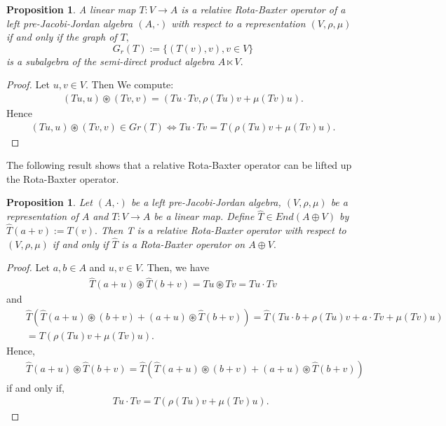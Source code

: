 \documentclass[12pt]{amsart}
\newtheorem{proposition}[Theorem]{Proposition}
\begin{document}
\begin{proposition}
	A linear map $T : V\rightarrow A$ is a relative Rota-Baxter operator of a left pre-Jacobi-Jordan  algebra $(A, \cdot)$ with respect to a representation $(V,\rho,\mu)$  if and only if the graph of $T,$
	$$G_r(T):=\{(T(v), v), v\in  V\}$$
	is a subalgebra of the semi-direct product algebra $A\ltimes V.$
\end{proposition}
\begin{proof}
	Let $u,v\in V.$ Then  We compute:
	\begin{eqnarray}
		(Tu,u)\circledast (Tv,v)=(Tu\cdot Tv, \rho(Tu)v+\mu(Tv)u).\nonumber
	\end{eqnarray}
	Hence 
	\begin{eqnarray}
		(Tu,u)\circledast (Tv,v)\in Gr(T)\Leftrightarrow Tu\cdot Tv=T(\rho(Tu)v+\mu(Tv)u).\nonumber
	\end{eqnarray}
\end{proof}
The following result shows that a relative Rota-Baxter operator can be lifted up the
Rota-Baxter operator.
\begin{proposition}
	Let $(A, \cdot)$ be a left pre-Jacobi-Jordan algebra, $(V,\rho,\mu)$ be a representation of $A$ and
	$T : V\rightarrow A$ be a linear map. Define 
	$\widehat{T}\in End(A\oplus V)$ by 
	$\widehat{T}(a+v):=T(v).$ Then T is a relative Rota-Baxter operator with respect to $(V,\rho,\mu)$
	if and only if $\widehat{T}$ is a Rota-Baxter operator on $A\oplus V.$
\end{proposition}
\begin{proof}
	Let $a,b\in A$ and $u,v\in V.$ Then, we have
	\begin{eqnarray}
		\widehat{T}(a+u)\circledast\widehat{T}(b+v)=Tu\circledast Tv=Tu\cdot Tv\nonumber 
	\end{eqnarray}
	and
	\begin{eqnarray}
		&&\widehat{T}(\widehat{T}(a+u)\circledast(b+v)+(a+u)\circledast\widehat{T}(b+v))=\widehat{T}(Tu\cdot b+\rho(Tu)v+a\cdot Tv+\mu(Tv)u)\nonumber\\
		&&=T(\rho(Tu)v+\mu(Tv)u)\nonumber.
	\end{eqnarray}
	Hence,
	\begin{eqnarray}
		&&\widehat{T}(a+u)\circledast\widehat{T}(b+v)=\widehat{T}(\widehat{T}(a+u)\circledast(b+v)+(a+u)\circledast\widehat{T}(b+v))\nonumber
	\end{eqnarray}
	if and only if,
	\begin{eqnarray}
		&&Tu\cdot Tv=T(\rho(Tu)v+\mu(Tv)u).
		\nonumber
	\end{eqnarray}	
\end{proof}
\end{document}
